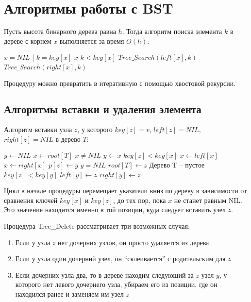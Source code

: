 \section{Алгоритмы работы с BST}
Пусть высота бинарного дерева равна $h$. Тогда алгоритм поиска элемента $k$ в дереве с корнем $x$ выполняется за время $O(h)$:
\begin{codebox}
\li \If $x = NIL$ | $k = key[x]$
\li \Then \Return $x$
\End
\li \If $k < key[x]$
\li \Then \Return $Tree\_Search(left[x], k)$
\li \Else \Return $Tree\_Search(right[x], k)$
\End
\end{codebox}
Процедуру можно превратить в итеративную с помощью хвостовой рекурсии.

\subsection{Алгоритмы вставки и удаления элемента}
Алгоритм вставки узла $z$, у которого $key[z] = v$, $left[z] = NIL$, $right[z] = NIL$ в дерево $T$:
\begin{codebox}
\li $y \gets NIL$
\li $x \gets root[T]$
\li \While $x \neq NIL$
\li   \Do $y \gets x$
\li     \If $key[z] < key[x]$
\li       \Then $x \gets left[x]$
\li       \Else $x \gets right[x]$
  \End
\End
\li $p[z] \gets y$
\li \If $y = NIL$
\li   \Then $root[T] \gets z$ \Comment Дерево T -- пустое
\li   \Else \If $key[z] < key[y]$
\li       \Then $left[y] \gets z$
\li       \Else $right[y] \gets z$
  \End
\End
\end{codebox}

Цикл в начале процедуры перемещает указатели вниз по дереву в зависимости от сравнения ключей $key[x]$ и $key[z]$, до тех пор, пока $x$ не станет равным NIL. Это значение находится именно в той позиции, куда следует вставить узел $z$.

Процедура Tree\_Delete рассматривает три возможных случая:
\begin{enumerate}
\item Если у узла $z$ нет дочерних узлов, он просто удаляется из дерева
\item Если у узла один дочерний узел, он ``склеивается'' с родительским для $z$
\item Если дочерних узла два, то в дереве находим следующий за $z$ узел $y$, у которого нет левого дочернего узла, убираем его из позиции, где он находился ранее и заменяем им узел $z$
\end{enumerate}

